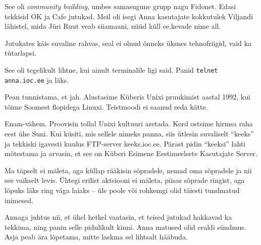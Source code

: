 
See oli \emph{community building}, umbes samasugune grupp nagu Fidonet. Edasi 
tekkisid OK  ja 
Cafe jutukad. Meil oli 
isegi Anna kasutajate kokkutulek Viljandi lähistel, mida 
Jüri Ruut veab siiamaani, nüüd küll ee.kevade nime all.

Jutukates käis suvaline rahvas, seal ei olnud õnneks üksnes tehnofriigid, vaid ka tütarlapsi. 


See oli tegelikult lihtne, kui ainult terminalile ligi said. Panid 
\verb|telnet anna.ioc.ee| ja läks. 


Pean tunnistama, et jah. Alustasime Küberis Unixi pruukimist aastal 
1992, kui tõime Soomest flopidega Linuxi. Teistmoodi ei 
saanud seda kätte. 


Enam-vähem. Proovisin tollal Unixi kultuuri aretada. Kord ostsime hirmsa
raha eest ühe Suni. Kui küsiti, mis sellele nimeks panna, siis ütlesin suvaliselt 
\enquote{keeks} ja tekkiski igavesti kuulus FTP-server keeks.ioc.ee. Pärast pidin \enquote{keeksi} lahti mõtestama ja 
arvasin, et see on Küberi Esimene Eestimeelsete Kasutajate Server.


Ma täpselt ei mäleta, aga küllap rääkisin sõpradele, nemad oma 
sõpradele ja nii see vaikselt levis. Ühtegi erilist 
aktsiooni ei mäleta, piisas sõprade ringist, aga lõpuks läks 
ring väga laiaks – üle poole või rohkemgi olid 
täiesti tundmatud inimesed. 

Annaga juhtus nii, et ühel hetkel vaatasin, et 
teised jutukad hakkavad ka tekkima, ning panin selle pidulikult kinni. 
Anna matused olid eraldi sündmus. Asja peab ära lõpetama, mitte laskma 
sel lihtsalt hääbuda. 

